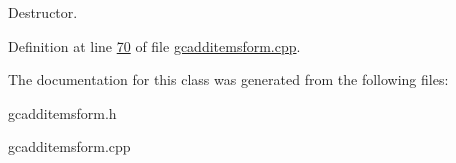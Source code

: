 \-Destructor. 



\-Definition at line \hyperlink{gcadditemsform_8cpp_source_l00070}{70} of file \hyperlink{gcadditemsform_8cpp_source}{gcadditemsform.\-cpp}.



\-The documentation for this class was generated from the following files\-:\begin{DoxyCompactItemize}
\item 
gcadditemsform.\-h\item 
gcadditemsform.\-cpp\end{DoxyCompactItemize}
